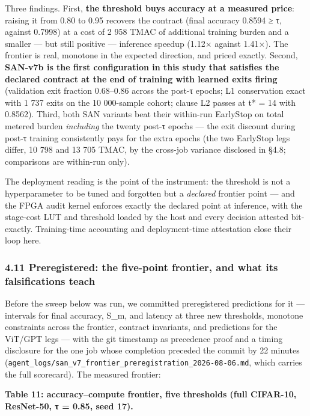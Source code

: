 \documentclass[
]{article}
\begin{document}
Three findings. First, \textbf{the threshold buys accuracy at a measured
price}: raising it from 0.80 to 0.95 recovers the contract (final
accuracy 0.8594 ≥ τ, against 0.7998) at a cost of 2 958 TMAC of
additional training burden and a smaller --- but still positive ---
inference speedup (1.12× against 1.41×). The frontier is real, monotone
in the expected direction, and priced exactly. Second, \textbf{SAN-v7b
is the first configuration in this study that satisfies the declared
contract at the end of training with learned exits firing} (validation
exit fraction 0.68--0.86 across the post-τ epochs; L1 conservation exact
with 1 737 exits on the 10 000-sample cohort; clause L2 passes at t* =
14 with 0.8562). Third, both SAN variants beat their within-run
EarlyStop on total metered burden \emph{including} the twenty post-τ
epochs --- the exit discount during post-τ training consistently pays
for the extra epochs (the two EarlyStop legs differ, 10 798 and 13 705
TMAC, by the cross-job variance disclosed in §4.8; comparisons are
within-run only).

The deployment reading is the point of the instrument: the threshold is
not a hyperparameter to be tuned and forgotten but a \emph{declared}
frontier point --- and the FPGA audit kernel enforces exactly the
declared point at inference, with the stage-cost LUT and threshold
loaded by the host and every decision attested bit-exactly.
Training-time accounting and deployment-time attestation close their
loop here.

\hypertarget{preregistered-the-five-point-frontier-and-what-its-falsifications-teach}{%
\subsubsection{4.11 Preregistered: the five-point frontier, and what its
falsifications
teach}\label{preregistered-the-five-point-frontier-and-what-its-falsifications-teach}}

Before the sweep below was run, we committed preregistered predictions
for it --- intervals for final accuracy, S\_m, and latency at three new
thresholds, monotone constraints across the frontier, contract
invariants, and predictions for the ViT/GPT legs --- with the git
timestamp as precedence proof and a timing disclosure for the one job
whose completion preceded the commit by 22 minutes
(\texttt{agent\_logs/san\_v7\_frontier\_preregistration\_2026-08-06.md},
which carries the full scorecard). The measured frontier:

\textbf{Table 11: accuracy--compute frontier, five thresholds (full
CIFAR-10, ResNet-50, τ = 0.85, seed 17).}
\end{document}
